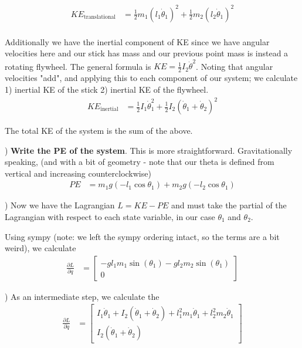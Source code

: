 \documentclass[conference]{IEEEtran}
\begin{document}
\begin{align}
    KE_{\text{translational}} &= \frac{1}{2} m_1 (l_1 \dot\theta_1)^2 + \frac{1}{2} m_2 (l_2 \dot\theta_1)^2\\
\end{align}

Additionally we have the inertial component of KE since we have angular
velocities here and our stick has mass and our previous point mass is instead a rotating
flywheel. The general formula is $KE = \frac{1}{2} I_2 \dot\theta^2$.
Noting that angular velocities "add", and applying this to each component of our
system; we calculate 1) inertial KE of the stick 2) inertial KE of the flywheel.
\begin{align}
    KE_{\text{inertial}} &= \frac{1}{2} I_1 \dot\theta_1^2 + \frac{1}{2}
    I_2 (\dot\theta_1 + \dot\theta_2)^2
\end{align}

The total KE of the system is the sum of the above.

) \textbf{Write the PE of the system}. This is more straightforward. Gravitationally
speaking, (and with a bit of geometry - note that our theta is defined from
vertical and increasing counterclockwise)
\begin{align}
    PE &= m_1 g (- l_1 \cos\theta_1) + m_2 g (- l_2 \cos\theta_1)
\end{align}

) Now we have the Lagrangian $L = KE - PE$ and must take the partial of the Lagrangian with
respect to each state variable, in our case $\theta_1$ and $\theta_2$.

Using sympy (note: we left the sympy ordering intact, so the terms are a
bit weird), we calculate
\begin{align}
    \frac{\partial L}{\partial q} &=
    \begin{bmatrix}
        -g l_1 m_1 \sin(\theta_1) - g l_2 m_2 \sin(\theta_1) \\
        0
    \end{bmatrix}
    \label{eq:partialq}
\end{align}

) As an intermediate step, we calculate the
\begin{align}
    \frac{\partial L}{\partial \dot q} &=
    \begin{bmatrix}
        I_1 \dot\theta_1 + I_2 (\dot\theta_1 + \dot\theta_2) +
            l_1^2 m_1 \dot\theta_1 + l_2^2 m_2 \dot \theta_1 \\
            I_2 (\dot \theta_1 + \dot\theta_2)
    \end{bmatrix}
    \label{eq:partialqdot}
\end{align}
\end{document}
